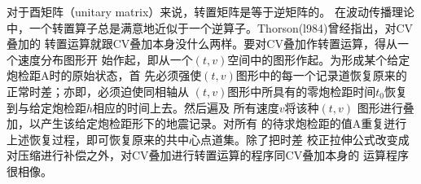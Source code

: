 对于酉矩阵（unitary matrix）来说，转置矩阵是等于逆矩阵的。
在波动传播理论
中，一个转置算子总是满意地近似于一个逆算子。Thorson(l984)曾经指出，对CV叠加的
转置运算就跟CV叠加本身没什么两样。要对CV叠加作转置运算，得从一个速度分布图形开
始作起，即从一个$(t,v)$空间中的图形作起。为形成某个给定炮检距A时的原始状态，首
先必须强使$(t,v)$图形中的每一个记录道恢复原来的正常时差；亦即，必须迫使同相轴从
$(t,v)$图形中所具有的零炮检距时间$t_0$恢复到与给定炮检距$h$相应的时间上去。然后遍及
所有速度$v$将该种$(t,v)$
图形进行叠加，以产生该给定炮检距形下的地震记录。对所有
的待求炮检距的值A重复迸行上述恢复过程，即可恢复原来的共中心点道集。除了把时差
校正拉伸公式改变成对压缩进行补偿之外，对CV叠加进行转置运算的程序同CV叠加本身的
运算程序很相像。






